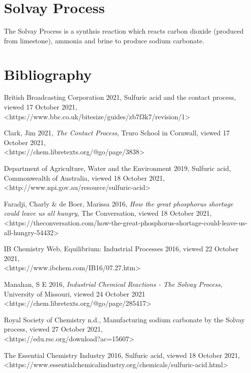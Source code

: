 \documentclass[12pt, a4paper]{article}
\begin{document}
\section{Solvay Process}

The Solvay Process is a synthsis reaction which reacts carbon dioxide (produced from limestone), ammonia and brine to produce sodium carbonate.



\pagebreak

\section{Bibliography}

British Broadcasting Corporation 2021, Sulfuric acid and the contact process, viewed 17 October 2021, \\ \textless{https://www.bbc.co.uk/bitesize/guides/zb7f3k7/revision/1}\textgreater

Clark, Jim 2021, \emph{The Contact Process}, Truro School in Cornwall, viewed 17 October 2021, \\ \textless{https://chem.libretexts.org/@go/page/3838}\textgreater

Department of Agriculture, Water and the Environment 2019, Sulfuric acid, Commonwealth of Australia, viewed 18 October 2021, \textless{http://www.npi.gov.au/resource/sulfuric-acid}\textgreater

Faradji, Charly \& de Boer, Marissa 2016, \emph{How the great phosphorus shortage could leave us all hungry}, The Conversation, viewed 18 October 2021, \\ \textless{https://theconversation.com/how-the-great-phosphorus-shortage-could-leave-us-all-hungry-54432}\textgreater

IB Chemistry Web, Equilibrium: Industrial Processes 2016, viewed 22 October 2021, \\ \textless{https://www.ibchem.com/IB16/07.27.htm}\textgreater

Manahan, S E 2016, \emph{Industrial Chemical Reactions - The Solvay Process}, University of Missouri, viewed 24 October 2021 \\ \textless{https://chem.libretexts.org/@go/page/285417}\textgreater

Royal Society of Chemistry n.d., Manufacturing sodium carbonate by the Solvay process, viewed 27 October 2021, \\ \textless{https://edu.rsc.org/download?ac=15607}\textgreater

The Essential Chemistry Industry 2016, Sulfuric acid, viewed 18 October 2021, \\ \textless{https://www.essentialchemicalindustry.org/chemicals/sulfuric-acid.html}\textgreater
\end{document}
